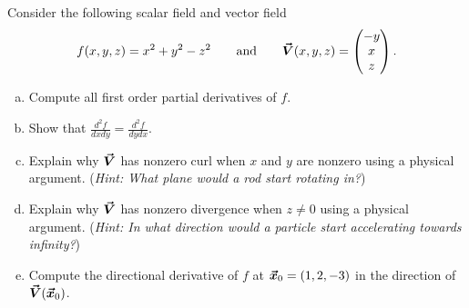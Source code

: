 \documentclass[12pt]{article} %
\begin{document}
\begin{problem}
Consider the following scalar field and vector field
\[
f(x,y,z) = x^2+y^2-z^2 \qquad \textrm{and} \qquad \boldsymbol{\vec{V}}(x,y,z) = \begin{pmatrix} -y \\ x \\ z \end{pmatrix}.
\]
\begin{enumerate}[(a)]
    \item Compute all first order partial derivatives of $f$.
    \item Show that $\frac{d^2 f}{d x d y} = \frac{d^2 f}{d y d x}$.
    \item Explain why $\boldsymbol{\vec{V}}$ has nonzero curl when $x$ and $y$ are nonzero using a physical argument. (\emph{Hint: What plane would a rod start rotating in?})
    \item Explain why $\boldsymbol{\vec{V}}$ has nonzero divergence when $z\neq 0$ using a physical argument. (\emph{Hint: In what direction would a particle start accelerating towards infinity?})
    \item Compute the directional derivative of $f$ at $\boldsymbol{\vec{x}}_0 = (1,2,-3)$ in the direction of $\boldsymbol{\vec{V}}(\boldsymbol{\vec{x}}_0)$.
\end{enumerate}
\end{problem}
\end{document}
